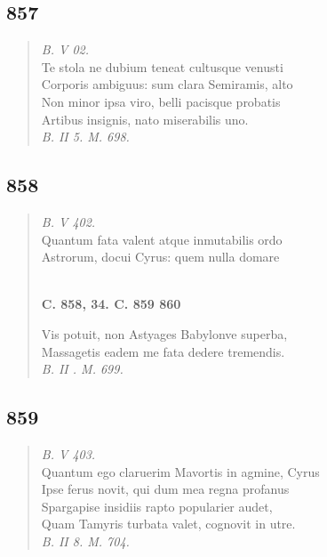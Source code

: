 \documentclass[11pt, a4paper]{report}
\begin{document}
            \subsection*{857}
      \begin{verse}
      \textit{B. V 02.} \\ Te stola ne dubium teneat cultusque venusti \\ Corporis ambiguus: sum clara Semiramis, alto \\ Non minor ipsa viro, belli pacisque probatis \\ Artibus insignis, nato miserabilis uno. \\ \textit{B. II 5. M. 698.} \\ 
      \end{verse}
  
            \subsection*{858}
      \begin{verse}
      \textit{B. V 402.} \\ Quantum fata valent atque inmutabilis ordo \\ Astrorum, docui Cyrus: quem nulla domare \\ 
        ﻿\pagebreak 
     \marginpar{[312]} \begin{center} \textbf{C. 858, 34. C. 859 860} \end{center}Vis potuit, non Astyages Babylonve superba, \\ Massagetis eadem me fata dedere tremendis. \\ \textit{B. II . M. 699.} \\ 
      \end{verse}
  
            \subsection*{859}
      \begin{verse}
      \textit{B. V 403.} \\ Quantum ego claruerim Mavortis in agmine, Cyrus \\ Ipse ferus novit, qui dum mea regna profanus \\ Spargapise insidiis rapto popularier audet, \\ Quam Tamyris turbata valet, cognovit in utre. \\ \textit{B. II 8. M. 704.} \\ 
      \end{verse}
  
\end{document}
